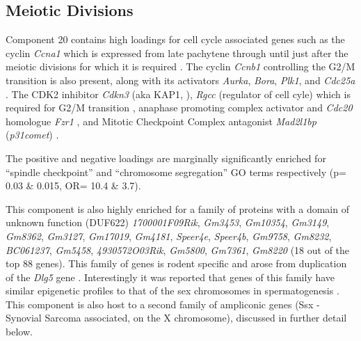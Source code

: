 \subsection{Meiotic Divisions}
Component 20 contains high loadings for cell cycle associated genes such as the cyclin \textit{Ccna1} which is expressed from late pachytene through until just after the meiotic divisions \parencite{Sweeney1996distinct} for which it is required \parencite{Liu1998Cyclin}. The cyclin \textit{Ccnb1} controlling the G2/M transition is also present, along with its activators \textit{Aurka}, \textit{Bora}, \textit{Plk1}, and \textit{Cdc25a} \parencite[Reviewed in ]{Joukov2018AuroraPLK1}. The CDK2 inhibitor \textit{Cdkn3} (aka KAP1, \parencite{Poon1995Dephosphorylation}), \textit{Rgcc} (regulator of cell cyle) which is required for G2/M transition \parencite{Saigusa2007RGC32}, anaphase promoting complex activator and \textit{Cdc20} homologue \textit{Fzr1} \parencite{Holt2014APC}, and Mitotic Checkpoint Complex antagonist \textit{Mad2l1bp} (\textit{p31comet}) \parencite{Habu2002Identification}.

The positive and negative loadings are marginally significantly enriched for ``spindle checkpoint'' and ``chromosome segregation'' GO terms respectively (p= 0.03 \& 0.015, OR= 10.4 \& 3.7).

This component is also highly enriched for a family of proteins with a domain of unknown function (DUF622) \textit{1700001F09Rik}, \textit{Gm3453}, \textit{Gm10354}, \textit{Gm3149}, \textit{Gm8362}, \textit{Gm3127}, \textit{Gm17019}, \textit{Gm4181}, \textit{Speer4e}, \textit{Speer4b}, \textit{Gm9758}, \textit{Gm8232}, \textit{BC061237}, \textit{Gm5458}, \textit{4930572O03Rik}, \textit{Gm5800}, \textit{Gm7361}, \textit{Gm8220} (18 out of the top 88 genes). This family of genes is rodent specific and arose from duplication of the \textit{Dlg5} gene \parencite{Church2009Lineagespecific}. Interestingly it was reported that genes of this family have similar epigenetic profiles to that of the sex chromosomes in spermatogenesis \parencite{Moretti2016Expression}. This component is also host to a second family of ampliconic genes (Ssx - Synovial Sarcoma associated, on the X chromosome), discussed in further detail below.

